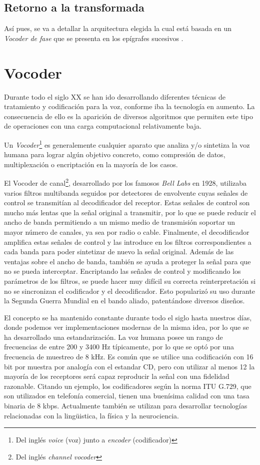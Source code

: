 \subsection{Retorno a la transformada}
Así pues, se va a detallar la arquitectura elegida la cual está basada en un \emph{Vocoder de fase} que se presenta en los epígrafes sucesivos \cite{VocHis}.
\section{Vocoder}
Durante todo el siglo XX se han ido desarrollando diferentes técnicas de tratamiento y codificación para la voz, conforme iba la tecnología en aumento. La consecuencia de ello es la aparición de diversos algoritmos que permiten este tipo de operaciones con una carga computacional relativamente baja. 

Un \emph{Vocoder}\footnote{Del inglés \emph{voice} (voz) junto a \emph{encoder} (codificador)} es generalemente cualquier aparato que analiza y/o sintetiza la voz humana para lograr  algún objetivo concreto, como compresión de datos, multiplexación o encriptación en la mayoría de los casos. \cite{VocOvw}

El Vocoder de canal\footnote{Del inglés \emph{channel vocoder}}, desarrollado por los famosos \emph{Bell Labs} en 1928, utilizaba varios filtros multibanda seguidos por detectores de envolvente cuyas señales de control se transmitían al decodificador del receptor. Estas señales de control son mucho más lentas que la señal original a transmitir, por lo que se puede reducir el ancho de banda permitiendo a un mismo medio de transmisión soportar un mayor número de canales, ya sea por radio o cable. Finalmente, el decodificador amplifica estas señales de control y las introduce en los filtros correspondientes a cada banda para poder sintetizar de nuevo la señal original. Además de las ventajas sobre el ancho de banda, también se ayuda a proteger la señal para que no se pueda interceptar. Encriptando las señales de control y modificando los parámetros de los filtros, se puede hacer muy difícil su correcta reinterpretación si no se sincronizan el codificador y el decodificador. Esto popularizó su uso durante la Segunda Guerra Mundial en el bando aliado, patentándose diversos diseños.

El concepto se ha mantenido constante durante todo el siglo hasta nuestros días, donde podemos ver implementaciones modernas de la misma idea, por lo que se ha desarrollado una estandarización. La voz humana posee un rango de frecuencias de entre 200 y 3400 Hz típicamente, por lo que se optó por una frecuencia de muestreo de 8 kHz. Es común que se utilice una codificación con 16 bit por muestra por analogía con el estandar CD, pero con utilizar al menos 12 la mayoría de los receptores será capaz reproducir la señal con una fidelidad razonable. Citando un ejemplo, los codificadores según la norma ITU G.729, que son utilizados en telefonía comercial, tienen una buenísima calidad con una tasa binaria de 8 kbps. Actualmente también se utilizan para desarrollar tecnologías relacionadas con la lingüistica, la física y la neurociencia.

